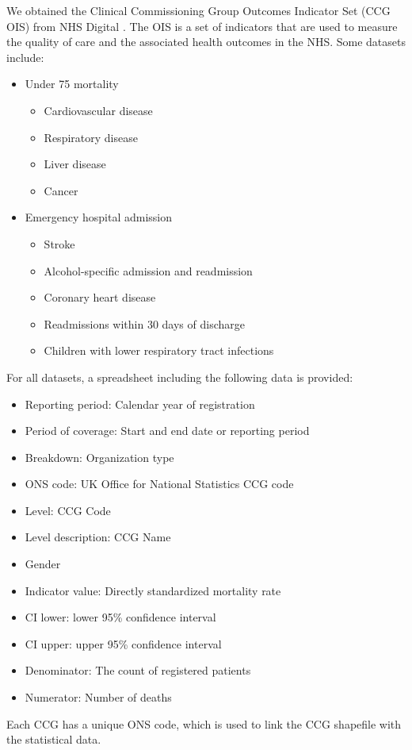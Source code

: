 We obtained the Clinical Commissioning Group Outcomes Indicator Set (CCG OIS) from NHS Digital \cite{nhsdigitalClinical}. The OIS is a set of indicators that are used to measure the quality of care and the associated health outcomes in the NHS. Some datasets include:
\begin{itemize}
    \item Under 75 mortality
    \begin{multicols}{2}
        \begin{itemize}
            \item Cardiovascular disease
            \item Respiratory disease
            \item Liver disease
            \item Cancer
        \end{itemize}
    \end{multicols}
    \item Emergency hospital admission
        \begin{itemize}
            \item Stroke
            \item Alcohol-specific admission and readmission
            \item Coronary heart disease
            \item Readmissions within 30 days of discharge
            \item Children with lower respiratory tract infections
        \end{itemize}
\end{itemize}

For all datasets, a spreadsheet including the following data is provided:

\begin{itemize}
    \item Reporting period: Calendar year of registration
    \item Period of coverage: Start and end date or reporting period
    \item Breakdown: Organization type
    \item ONS code: UK Office for National Statistics CCG code
    \item Level: CCG Code
    \item Level description: CCG Name
    \item Gender
    \item Indicator value: Directly standardized mortality rate
    \item CI lower: lower 95\% confidence interval
    \item CI upper: upper 95\% confidence interval
    \item Denominator: The count of registered patients
    \item Numerator: Number of deaths
\end{itemize}

Each CCG has a unique ONS code, which is used to link the CCG shapefile with the statistical data.